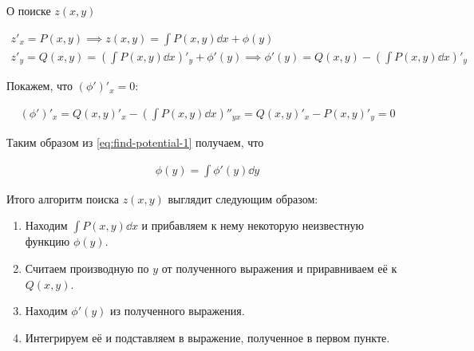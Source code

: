 \begin{remark}
  О поиске \(z(x, y)\)

  \begin{align*}\label{eq:find-potential-1}\tag{\(1\)}
    z'_{x} = P(x, y) \implies z(x, y) = \int P(x, y) \dd x + \phi(y) \\
    z'_{y} = Q(x, y) = \left(\int P(x, y) \dd x\right)'_{y} + \phi'(y)
    \implies \phi'(y) = Q(x, y) - \left(\int P(x, y) \dd x\right)'_{y}
  \end{align*}

  Покажем, что \((\phi')'_{x} = 0\):

  \begin{align*}
    (\phi')'_{x}
    = Q(x, y)'_{x} - \left(\int P(x, y) \dd x\right)''_{yx}
    = Q(x, y)'_{x} - P(x, y)'_{y}
    = 0
  \end{align*}

  Таким образом из \eqref{eq:find-potential-1} получаем, что

  \begin{align*}
    \phi(y) = \int \phi'(y) \dd y
  \end{align*}

  Итого алгоритм поиска \(z(x, y)\) выглядит следующим образом:
  \begin{enumerate}
    \item Находим \(\int P(x, y) \dd x\) и прибавляем к нему некоторую
      неизвестную функцию \(\phi(y)\).

    \item Считаем производную по \(y\) от полученного выражения и приравниваем
      её к \(Q(x, y)\).

    \item Находим \(\phi'(y)\) из полученного выражения.
    
    \item Интегрируем её и подставляем в выражение, полученное в первом пункте.
  \end{enumerate}
\end{remark}


